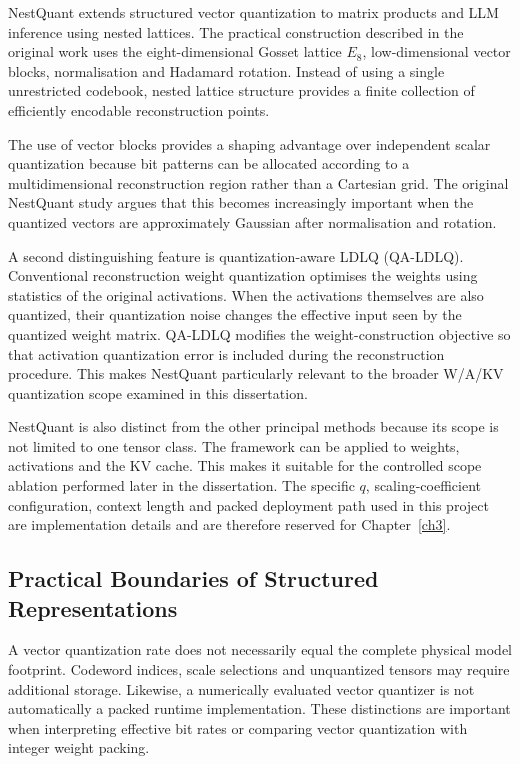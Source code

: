 NestQuant extends structured vector quantization to matrix products and
LLM inference using nested lattices. The practical
construction described in the original work uses the eight-dimensional
Gosset lattice \(E_8\), low-dimensional vector blocks, normalisation and
Hadamard rotation. Instead of using a single unrestricted codebook,
nested lattice structure provides a finite collection of efficiently
encodable reconstruction points\cite{savkin2025nestquantnestedlatticequantization}.

The use of vector blocks provides a shaping advantage over independent
scalar quantization because bit patterns can be allocated according to a
multidimensional reconstruction region rather than a Cartesian grid.
The original NestQuant study argues that this becomes increasingly
important when the quantized vectors are approximately Gaussian after
normalisation and rotation.

A second distinguishing feature is quantization-aware LDLQ
(\mbox{QA-LDLQ}). Conventional reconstruction weight quantization
optimises the weights using statistics of the original activations.
When the activations themselves are also quantized, their quantization
noise changes the effective input seen by the quantized weight matrix.
QA-LDLQ modifies the weight-construction objective so that activation
quantization error is included during the reconstruction procedure. This makes NestQuant
particularly relevant to the broader W/A/KV quantization scope examined
in this dissertation.

NestQuant is also distinct from the other principal methods because its
scope is not limited to one tensor class. The framework can be applied to
weights, activations and the KV cache. This makes it suitable for the
controlled scope ablation performed later in the dissertation. The
specific \(q\), scaling-coefficient configuration, context length and
packed deployment path used in this project are implementation details
and are therefore reserved for Chapter~\ref{ch3}.

\subsection{Practical Boundaries of Structured Representations}
A vector quantization rate does not necessarily equal the complete
physical model footprint. Codeword indices, scale selections and
unquantized tensors may require additional storage. Likewise, a
numerically evaluated vector quantizer is not automatically a packed
runtime implementation. These distinctions are important when
interpreting effective bit rates or comparing vector quantization with
integer weight packing.

